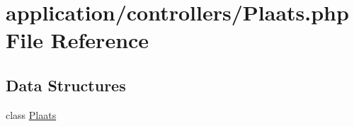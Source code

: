 \hypertarget{_plaats_8php}{}\section{application/controllers/\+Plaats.php File Reference}
\label{_plaats_8php}
\subsection*{Data Structures}
\begin{DoxyCompactItemize}
\item 
class \mbox{\hyperlink{class_plaats}{Plaats}}
\end{DoxyCompactItemize}
